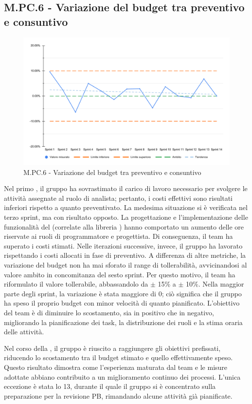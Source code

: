 \subsection{M.PC.6 - Variazione del budget tra preventivo e consuntivo}
\begin{figure}[H]
    \centering
    \includegraphics[width=\textwidth]{assets/variazione_budget.pdf}
    \caption{M.PC.6 - Variazione del budget tra preventivo e consuntivo}
\end{figure}

\par Nel primo , il gruppo ha sovrastimato il carico di lavoro necessario per svolgere le attività assegnate al ruolo di analista; pertanto, i costi effettivi sono risultati inferiori rispetto a quanto preventivato. La medesima situazione si è verificata nel terzo sprint, ma con risultato opposto. La progettazione e l'implementazione delle funzionalità del  (correlate alla libreria ) hanno comportato un aumento delle ore riservate ai ruoli di programmatore e progettista. Di conseguenza, il team ha superato i costi stimati. Nelle iterazioni successive, invece, il gruppo ha lavorato rispettando i costi allocati in fase di preventivo. A differenza di altre metriche, la variazione del budget non ha mai sforato il range di tollerabilità, avvicinandosi al valore ambito in concomitanza del sesto sprint. Per questo motivo, il team ha riformulato il valore tollerabile, abbassandolo da $\pm$ 15\% a $\pm$ 10\%. Nella maggior parte degli sprint, la variazione è stata maggiore di 0; ciò significa che il gruppo ha speso il proprio budget con minor velocità di quanto pianificato. L'obiettivo del team è di diminuire lo scostamento, sia in positivo che in negativo, migliorando la pianificazione dei task, la distribuzione dei ruoli e la stima oraria delle attività. 

\par Nel corso della , il gruppo è riuscito a raggiungere gli obiettivi prefissati, riducendo lo scostamento tra il budget stimato e quello effettivamente speso. Questo risultato dimostra come l'esperienza maturata dal team e le misure adottate abbiano contribuito a un miglioramento continuo dei processi. L'unica eccezione è stata lo  13, durante il quale il gruppo si è concentrato sulla preparazione per la revisione PB, rimandando alcune attività già pianificate.
